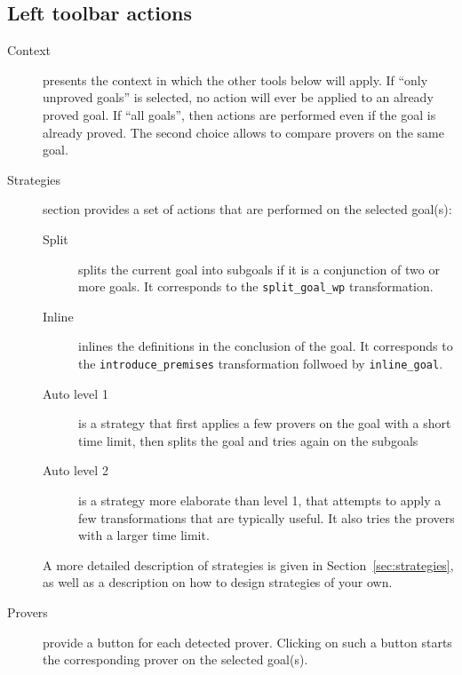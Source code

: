 
\subsection{Left toolbar actions}

\begin{description}
\item[Context] presents the context in which the other tools below will
  apply. If ``only unproved goals'' is selected, no action will ever
  be applied to an already proved goal.  If ``all goals'', then
  actions are performed even if the goal is already proved. The second
  choice allows to compare provers on the same goal.

\item[Strategies] section provides a set of actions that are
  performed on the selected goal(s):
  \begin{description}
  \item[Split] splits the current goal into subgoals if it is a
    conjunction of two or more goals. It corresponds to the
    \verb|split_goal_wp| transformation.
  \item[Inline] inlines the definitions in the conclusion of the goal.
    It corresponds to the \verb|introduce_premises| transformation
    follwoed by \verb|inline_goal|.
  \item[Auto level 1] is a strategy that first applies a few provers
    on the goal with a short time limit, then splits the goal and
    tries again on the subgoals
  \item[Auto level 2] is a strategy more elaborate than level 1, that
    attempts to apply a few transformations that are typically
    useful. It also tries the provers with a larger time limit.
  \end{description}
  A more detailed description of strategies is given in
  Section~\ref{sec:strategies}, as well as a description on how to
  design strategies of your own.

\item[Provers] provide a button for each detected prover. Clicking on such a
  button starts the corresponding prover on the selected goal(s).



\end{description}
